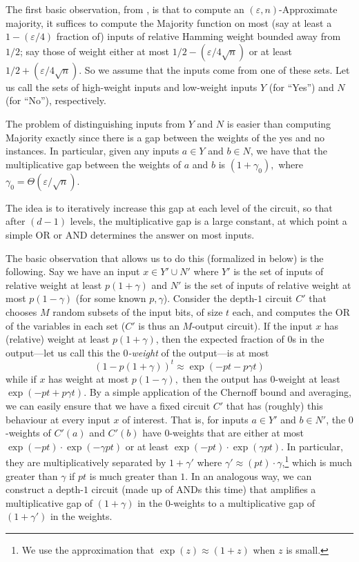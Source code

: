 \documentclass{toc}
\begin{document}
The first basic observation, from \cite{odonnellwimmer}, is that to compute an $(\varepsilon,n)$-Approximate majority, it suffices to compute the Majority function on most (say at least a $1-(\varepsilon/4)$ fraction of) inputs of relative Hamming weight bounded away from $1/2$; say those of weight either at most ${1}/{2}-(\varepsilon /4\sqrt{n})$ or at least ${1}/{2}+(\varepsilon/4\sqrt{n})$. So we assume that the inputs come from one of these sets. Let us call the sets of high-weight inputs and low-weight inputs $Y$ (for ``Yes'') and 
$N$ (for ``No''),  %
respectively. 
%

The problem of distinguishing inputs from $Y$ and $N$ is easier than computing Majority exactly since there is a gap between the weights of the yes and no instances. In particular, given any inputs $a\in Y$ and $b\in N$, we have that the multiplicative gap between the weights of $a$ and $b$ is $(1+\gamma_0),$ where $\gamma_0 = \Theta(\varepsilon/\sqrt{n})$.

The idea is to iteratively increase this gap at each level of the circuit, so that after $(d-1)$ levels, the multiplicative gap is a large constant, at which point a simple OR or AND determines the answer on most inputs. 

The basic observation that allows us to do this (formalized in  below) is the following. Say we have an input $x\in Y'\cup N'$ where $Y'$ is the set of inputs of relative weight at least $p(1+\gamma)$ and $N'$ is the set of inputs of relative weight at most $p(1-\gamma)$ (for some known $p,\gamma$). Consider the depth-$1$ circuit $C'$ that chooses $M$
%
random subsets of the input bits, %
%
%
of size $t$ each, 
and %
computes   %
the OR of the variables in each set ($C'$ is thus an $M$-output circuit). If the input $x$ has (relative) weight at least $p(1+\gamma)$, then the expected fraction of $0$s in the output---let us call this the \emph{$0$-weight} of the output---is at most
\[
(1-p(1+\gamma))^t\approx \exp(-pt -p\gamma t)
\]
while if $x$ has weight at most $p(1-\gamma),$ then the output has $0$-weight at least $\exp(-pt + p\gamma t)$.  By a simple application of the Chernoff bound and averaging, we can easily ensure that we have a fixed circuit $C'$ that has (roughly) this behaviour at every input $x$ of interest. That is, for inputs $a\in Y'$ and $b\in N'$, the $0$-weights of $C'(a)$ and $C'(b)$ have $0$-weights that are either at most $\exp(-pt)\cdot \exp(-\gamma pt)$ or at least $\exp(-pt)\cdot \exp(\gamma pt)$. In particular, they are multiplicatively separated by $1+\gamma'$ where $\gamma'\approx (pt)\cdot \gamma$,\footnote{We use the approximation that $\exp(z) \approx (1+z)$ when $z$ is small.} which is much
%
greater   %
than $\gamma$ if
%
$pt$ is much greater than $1$.   %
In an analogous way, we can construct a depth-$1$ circuit (made up of ANDs this time) that amplifies a multiplicative gap of $(1+\gamma)$ in the $0$-weights to a multiplicative gap of $(1+\gamma')$ in the weights. 
\end{document}
